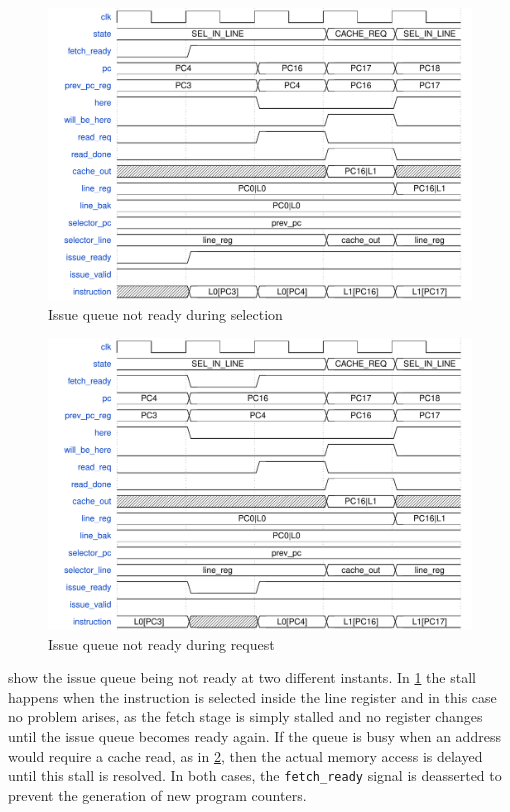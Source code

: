 \begin{figure}[!h]
  \centering
  \includegraphics[scale=.6]{img/fetch03.pdf}
  \caption{Issue queue not ready during selection}
  \label{fig:fetch03}
\end{figure}
\begin{figure}[!h]
  \centering
  \includegraphics[scale=.6]{img/fetch04.pdf}
  \caption{Issue queue not ready during request}
  \label{fig:fetch04}
\end{figure}
 show the issue queue being not ready at two different instants. In \cref{fig:fetch03} the stall happens when the instruction is selected inside the line register and in this case no problem arises, as the fetch stage is simply stalled and no register changes until the issue queue becomes ready again. If the queue is busy when an address would require a cache read, as in \cref{fig:fetch04}, then the actual memory access is delayed until this stall is resolved.  In both cases, the \texttt{fetch\_ready} signal is deasserted to prevent the generation of new program counters.

